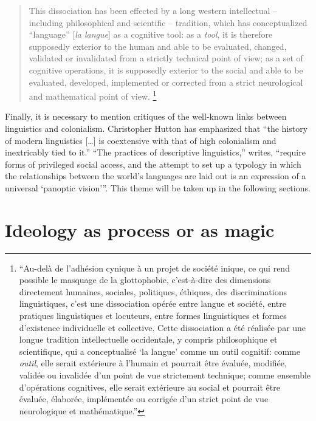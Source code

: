 \documentclass[output=paper]{langscibook}
\begin{document}
\begin{quotation}
This dissociation has been effected by a long western intellectual -- including philosophical and scientific -- tradition, which has conceptualized ``language'' [\emph{la langue}] as a cognitive tool: as a \emph{tool}, it is therefore supposedly exterior to the human and able to be evaluated, changed, validated or invalidated from a strictly technical point of view; as a set of cognitive operations, it is supposedly exterior to the social and able to be evaluated, developed, implemented or corrected from a strict neurological and mathematical point of view. \citep[73--73]{Blanchet2016}\footnote{``Au-delà de l'adhésion cynique à un projet de société inique, ce qui rend possible le masquage de la glottophobie, c'est-à-dire des dimensions directement humaines, sociales, politiques, éthiques, des discriminations linguistiques, c'est une dissociation opérée entre langue et société, entre pratiques linguistiques et locuteurs, entre formes linguistiques et formes d'existence individuelle et collective. Cette dissociation a été réalisée par une longue tradition intellectuelle occidentale, y compris philosophique et scientifique, qui a conceptualisé `la langue' comme un outil cognitif: comme \emph{outil}, elle serait extérieure à l'humain et pourrait être évaluée, modifiée, validée ou invalidée d'un point de vue strictement technique; comme ensemble d'opérations cognitives, elle serait extérieure au social et pourrait être évaluée, élaborée, implémentée ou corrigée d'un strict point de vue neurologique et mathématique.''}
\end{quotation}

Finally, it is necessary to mention critiques of the well-known links between linguistics and colonialism. Christopher Hutton has emphasized that ``the history of modern linguistics […] is coextensive with that of high colonialism and inextricably tied to it.'' ``The practices of descriptive linguistics,'' \citet[291]{Hutton2001} writes, ``require forms of privileged social access, and the attempt to set up a typology in which the relationships between the world's languages are laid out is an expression of a universal `panoptic vision'\thinspace''. This theme will be taken up in the following sections.

\section{Ideology as process or as magic}
\label{sec:riemer:ideologymagicprocess}
\end{document}
